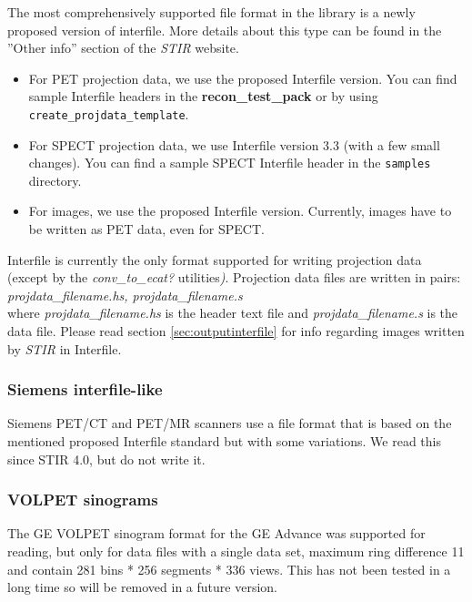 \documentclass{article}
\begin{document}
The most comprehensively supported file format in the library 
is a newly proposed version of interfile. More details about 
this type can be found in the ''Other info'' section of the \textit{STIR} website.

\begin{itemize}
\item For PET projection data, we use the proposed Interfile version. You can
find sample Interfile headers in the \textbf{recon\_test\_pack} or by using
\texttt{create\_projdata\_template}.

\item For SPECT projection data, we use Interfile version 3.3 (with a few small changes).
You can find a sample SPECT Interfile header in the \texttt{samples} directory.

\item For images, we use the proposed Interfile version. Currently, images have to 
be written as PET data, even for SPECT.
\end{itemize}

Interfile is currently the only format supported for writing projection 
data (except by the \textit{conv\_to\_ecat?} utilities\textit{)}. Projection 
data files are written in pairs:\\
\textit{projdata\_filename.hs, 
projdata\_filename.s}\\
where \textit{projdata\_filename.hs} is the header text file and \textit{projdata\_filename.s} 
is the data file. Please read section \ref{sec:outputinterfile} for info regarding 
images written by \textit{STIR} in Interfile.

\subsubsection{Siemens interfile-like}
Siemens PET/CT and PET/MR scanners use a file format that is based on the mentioned
proposed Interfile standard but with some variations. We read this since STIR 4.0,
but do not write it.

\subsubsection{VOLPET sinograms}

The GE VOLPET sinogram format for the GE Advance was supported for reading, but 
only for data files with a single data set, maximum ring 
difference 11 and contain 281 bins * 256 segments * 336 views.
This has not been tested in a long time so will be removed in a future version.
\end{document}

